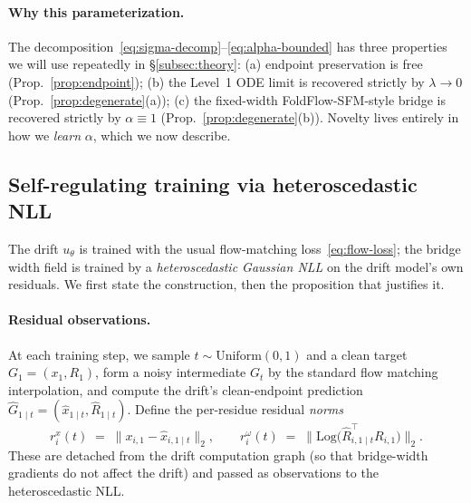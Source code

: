 \documentclass{article}
\theoremstyle{remark}
\theoremstyle{definition}
\newcommand{\Log}{\mathrm{Log}}
\begin{document}
\paragraph{Why this parameterization.}
The decomposition~\eqref{eq:sigma-decomp}--\eqref{eq:alpha-bounded} has three
properties we will use repeatedly in \S\ref{subsec:theory}:
(a) endpoint preservation is free (Prop.~\ref{prop:endpoint});
(b) the Level~1 ODE limit is recovered strictly by $\lambda\to 0$
(Prop.~\ref{prop:degenerate}(a));
(c) the fixed-width FoldFlow-SFM-style bridge is recovered strictly by
$\alpha\equiv 1$ (Prop.~\ref{prop:degenerate}(b)).
Novelty lives entirely in how we \emph{learn} $\alpha$, which we now describe.

\subsection{Self-regulating training via heteroscedastic NLL}
\label{subsec:nll}

The drift $u_\theta$ is trained with the usual flow-matching
loss~\eqref{eq:flow-loss}; the bridge width field is trained by a
\emph{heteroscedastic Gaussian NLL} on the drift model's own residuals. We
first state the construction, then the proposition that justifies it.

\paragraph{Residual observations.}
At each training step, we sample $t\sim\mathrm{Uniform}(0,1)$ and a clean
target $G_1=(x_1,R_1)$, form a noisy intermediate $G_t$ by the standard flow
matching interpolation, and compute the drift's clean-endpoint prediction
$\hat{G}_{1\mid t}=(\hat{x}_{1\mid t},\hat{R}_{1\mid t})$. Define the
per-residue residual \emph{norms}
\begin{equation}
r^x_i(t)\;=\;\big\|x_{i,1}-\hat{x}_{i,1\mid t}\big\|_2,\qquad
r^\omega_i(t)\;=\;\big\|\Log\!\big(\hat{R}_{i,1\mid t}^\top R_{i,1}\big)\big\|_2.
\label{eq:residual}
\end{equation}
These are detached from the drift computation graph (so that bridge-width
gradients do not affect the drift) and passed as observations to the
heteroscedastic NLL.
\end{document}
